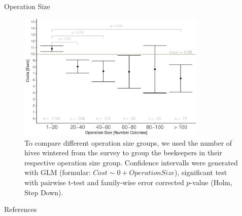 \documentclass{beamer}
\begin{document}
\begin{frame}{}
\begin{columns}[t]
\begin{column}{0.49\textwidth}
    \begin{block}{Operation Size}

      \begin{figure}
      \begin{minipage}[t][0.20\paperheight][c]{0.97\textwidth} 
      \centering
      \includegraphics[width=0.8\textwidth]{img/operation-ci-1.pdf}
      \caption{To compare different operation size groups, we used the number of hives wintered from the survey to group the beekeepers in their respective operation size group. Confidence intervalls were generated with GLM (formular: $Cost \sim 0 + Operation Size$), significant test with pairwise t-test and family-wise error corrected $p$-value (Holm, Step Down).}
      \end{minipage}
      \end{figure}

    \end{block}


    {
      \begin{block}{References}
      {
      \footnotesize
      \printbibliography
      }
      \end{block}
    }

  \end{column}
\end{columns}

\end{frame}
\end{document}
